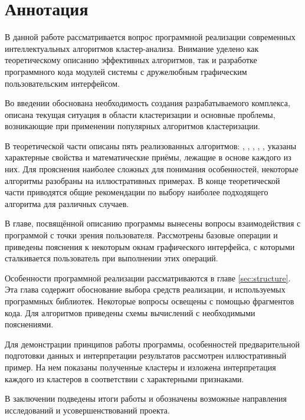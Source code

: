 \documentclass[12pt]{diploma}
\begin{document}
	\begin{titlepage}
		
	\end{titlepage}
	
	\section*{Аннотация}
		
	В данной работе рассматривается вопрос программной реализации современных интеллектуальных алгоритмов кластер-анализа. Внимание уделено как теоретическому описанию эффективных алгоритмов, так и разработке программного кода модулей системы с дружелюбным графическим пользовательским интерфейсом. 
	
	Во введении обоснована необходимость создания разрабатываемого комплекса, описана текущая ситуация в области кластеризации и основные проблемы, возникающие при применении популярных алгоритмов кластеризации. 
	
	В теоретической части описаны пять реализованных алгоритмов: \ikmeans, \AWard, \AWardpb, \dePDDP, \BiKMR, указаны характерные свойства и математические приёмы, лежащие в основе каждого из них. Для прояснения наиболее сложных для понимания особенностей, некоторые алгоритмы разобраны на иллюстративных примерах. В конце теоретической части приводятся общие рекомендации по выбору наиболее подходящего алгоритма для различных случаев.
	
	В главе, посвящённой описанию программы вынесены вопросы взаимодействия с программой с точки зрения пользователя. Рассмотрены базовые операции и приведены пояснения к некоторым окнам графического интерфейса, с которыми сталкивается пользователь при выполнении этих операций. 
	
	Особенности программной реализации рассматриваются в главе \ref{sec:structure}. Эта глава содержит обоснование выбора средств реализации, и используемых программных библиотек. Некоторые вопросы освещены с помощью фрагментов кода. Для алгоритмов приведены схемы вычислений с необходимыми пояснениями.
	
	Для демонстрации принципов работы программы, особенностей предварительной подготовки данных и интерпретации результатов рассмотрен иллюстративный пример. На нем показаны полученные кластеры и изложена интерпретация каждого из кластеров в соответствии с характерными признаками.
	
	В заключении подведены итоги работы и обозначены возможные направления исследований и усовершенствований проекта.
	
\end{document}

